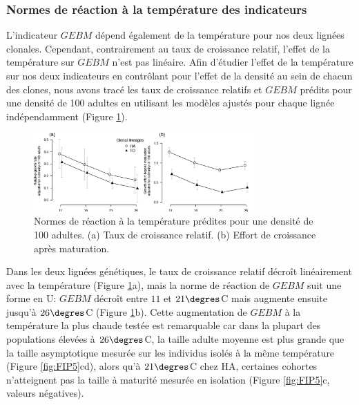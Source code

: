 \subsubsection{Normes de réaction à la température des indicateurs}

L'indicateur $GEBM$ dépend également de la température pour nos deux lignées
clonales. Cependant, contrairement au taux de croissance relatif, l'effet de la
température sur $GEBM$ n'est pas linéaire. Afin d'étudier l'effet de la
température sur nos deux indicateurs en contrôlant pour l'effet de la densité au
sein de chacun des clones, nous avons tracé les taux de croissance relatifs et
$GEBM$ prédits pour une densité de 100 adultes en utilisant les modèles ajustés
pour chaque lignée indépendamment (Figure \ref{fig:FIP7a}). 

\begin{figure}[!ht]
\begin{center}
\includegraphics[width=0.75\textwidth]{1_CorpsDeThese/Resumes/Fig/FIP07a}
\caption[Normes de réaction
prédites à la température]{Normes de réaction à la température prédites pour
une densité de 100 adultes. (a) Taux de croissance relatif. (b) Effort de
croissance après maturation.}
\label{fig:FIP7a}
\end{center}
\end{figure}

Dans les deux lignées génétiques, le taux de croissance relatif décroît
linéairement avec la température (Figure \ref{fig:FIP7a}a), mais la norme de
réaction de $GEBM$ suit une forme en U: $GEBM$ décroît entre $11$ et
$21\degres$C mais augmente ensuite jusqu'à $26\degres$C (Figure
\ref{fig:FIP7a}b). Cette augmentation de $GEBM$ à la température la plus chaude
testée est remarquable car dans la plupart des populations élevées à $26\degres$C, la
taille adulte moyenne est plus grande que la taille asymptotique mesurée sur les
individus isolés à la même température (Figure \ref{fig:FIP5}cd), alors qu'à
$21\degres$C chez HA, certaines cohortes n'atteignent pas la taille à maturité
mesurée en isolation (Figure \ref{fig:FIP5}c, valeurs négatives).

